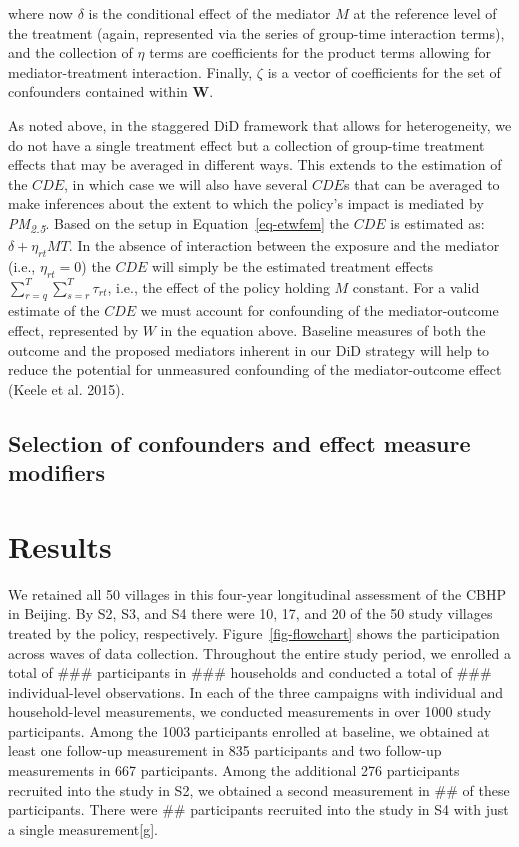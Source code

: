\documentclass[
  letterpaper,
  DIV=11,
  numbers=noendperiod]{scrartcl}
\begin{document}
where now \(\delta\) is the conditional effect of the mediator \(M\) at
the reference level of the treatment (again, represented via the series
of group-time interaction terms), and the collection of \(\eta\) terms
are coefficients for the product terms allowing for mediator-treatment
interaction. Finally, \(\zeta\) is a vector of coefficients for the set
of confounders contained within \(\mathbf{W}\).

As noted above, in the staggered DiD framework that allows for
heterogeneity, we do not have a single treatment effect but a collection
of group-time treatment effects that may be averaged in different ways.
This extends to the estimation of the \(CDE\), in which case we will
also have several \(CDE\)s that can be averaged to make inferences about
the extent to which the policy's impact is mediated by
\emph{PM\textsubscript{2.5}}. Based on the setup in
Equation~\ref{eq-etwfem} the \(CDE\) is estimated as:
\(\delta + \eta_{rt}MT\). In the absence of interaction between the
exposure and the mediator (i.e., \(\eta_{rt}=0\)) the \(CDE\) will
simply be the estimated treatment effects
\(\sum_{r=q}^{T} \sum_{s=r}^{T} \tau_{rt}\), i.e., the effect of the
policy holding \(M\) constant. For a valid estimate of the \(CDE\) we
must account for confounding of the mediator-outcome effect, represented
by \(W\) in the equation above. Baseline measures of both the outcome
and the proposed mediators inherent in our DiD strategy will help to
reduce the potential for unmeasured confounding of the mediator-outcome
effect (Keele et al. 2015).

\hypertarget{selection-of-confounders-and-effect-measure-modifiers}{%
\subsection{Selection of confounders and effect measure
modifiers}\label{selection-of-confounders-and-effect-measure-modifiers}}

\hypertarget{results-1}{%
\section{Results}\label{results-1}}

We retained all 50 villages in this four-year longitudinal assessment of
the CBHP in Beijing. By S2, S3, and S4 there were 10, 17, and 20 of the
50 study villages treated by the policy, respectively.
Figure~\ref{fig-flowchart} shows the participation across waves of data
collection. Throughout the entire study period, we enrolled a total of
\#\#\# participants in \#\#\# households and conducted a total of \#\#\#
individual-level observations. In each of the three campaigns with
individual and household-level measurements, we conducted measurements
in over 1000 study participants. Among the 1003 participants enrolled at
baseline, we obtained at least one follow-up measurement in 835
participants and two follow-up measurements in 667 participants. Among
the additional 276 participants recruited into the study in S2, we
obtained a second measurement in \#\# of these participants. There were
\#\# participants recruited into the study in S4 with just a single
measurement{[}g{]}.
\end{document}

